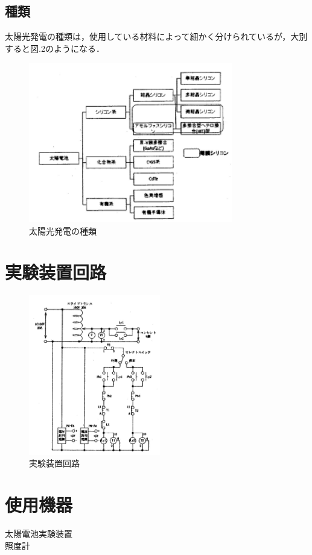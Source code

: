 \subsection{種類}
太陽光発電の種類は，使用している材料によって細かく分けられているが，大別すると図.2のようになる．\\
\begin{figure}[H]
  \centering
  \includegraphics[height=7cm]{./fig/fig02.png}
  \caption{太陽光発電の種類}
\end{figure}

\section{実験装置回路}
\begin{figure}[H]
  \centering
  \includegraphics[height=7cm]{./fig/fig03.png}
  \caption{実験装置回路}
\end{figure}

\section{使用機器}
太陽電池実験装置\\
照度計\\

